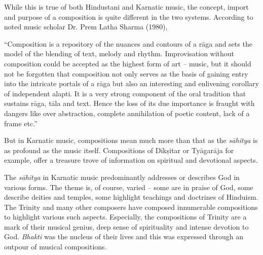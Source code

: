 While this is true of both Hindustani and Karnatic music, the concept, import and purpose of a composition is quite different in the two systems. According to noted music scholar Dr. Prem Latha Sharma (1980),

\begin{myquote}
“Composition is a repository of the nuances and contours of a rāga and sets the model of the blending of text, melody and rhythm. Improvisation without composition could be accepted as the highest form of art – music, but it should not be forgotten that composition not only serves as the basis of gaining entry into the intricate portals of a rāga but also an interesting and enlivening corollary of independent alapti. It is a very strong component of the oral tradition that sustains rāga, tāla and text. Hence the loss of its due importance is fraught with dangers like over abstraction, complete annihilation of poetic content, lack of a frame etc.”
\end{myquote}

\vspace{-.1cm}

But in Karnatic music, compositions mean much more than that as the \textit{sāhitya} is as profound as the music itself. Compositions of Dīkṣitar or Tyāgarāja for example, offer a treasure trove of information on spiritual and devotional aspects.


The \textit{sāhitya} in Karnatic music predominantly addresses or describes God in various forms. The theme is, of course, varied – some are in praise of God, some describe deities and temples, some highlight teachings and doctrines of Hinduism. The Trinity and many other composers have composed innumerable compositions to highlight various such aspects. Especially, the compositions of Trinity are a mark of their musical genius, deep sense of spirituality and intense devotion to God. \textit{Bhakti} was the nucleus of their lives and this was expressed through an outpour of musical compositions.


